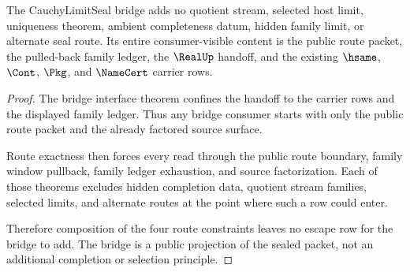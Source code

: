 \begin{theorem}
\label{thm:cauchy-limit-seal-bridge-nonescape}
The CauchyLimitSeal bridge adds no quotient stream, selected host limit, uniqueness theorem, ambient completeness datum, hidden family limit, or alternate seal route. Its entire consumer-visible content is the public route packet, the pulled-back family ledger, the $\RealUp$ handoff, and the existing $\hsame$, $\Cont$, $\Pkg$, and $\NameCert$ carrier rows.
\end{theorem}
\begin{proof}
The bridge interface theorem confines the handoff to the carrier rows and the displayed family ledger. Thus any bridge consumer starts with only the public route packet and the already factored source surface.

Route exactness then forces every read through the public route boundary, family window pullback, family ledger exhaustion, and source factorization. Each of those theorems excludes hidden completion data, quotient stream families, selected limits, and alternate routes at the point where such a row could enter.

Therefore composition of the four route constraints leaves no escape row for the bridge to add. The bridge is a public projection of the sealed packet, not an additional completion or selection principle.
\end{proof}

